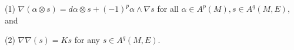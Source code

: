(1) $\nabla(\alpha \otimes s) = d\alpha \otimes s + (-1)^p\alpha \wedge \nabla s$ for all $\alpha \in A^p(M), s \in A^q(M, E)$, and

(2) $\nabla\nabla(s) = Ks$ for any $s \in A^q(M, E)$.
